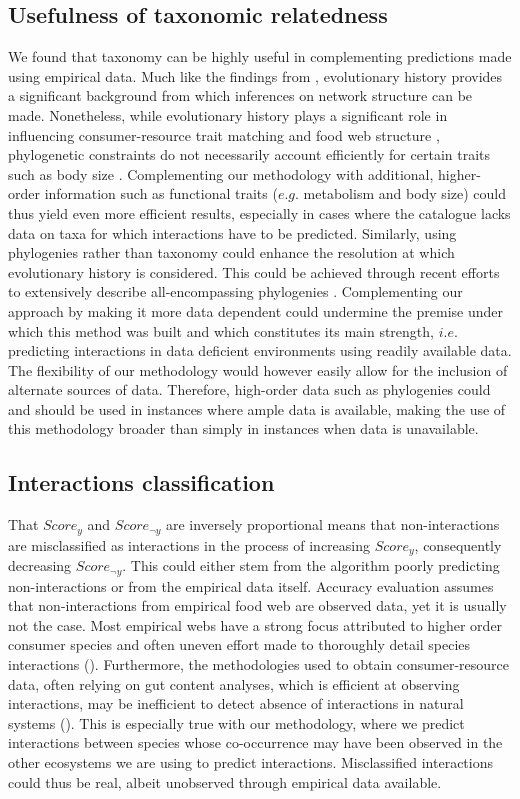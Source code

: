 \subsection{Usefulness of taxonomic relatedness}
We found that taxonomy can be highly useful in complementing predictions made using empirical data. Much like the findings from \citet{eklof2016}, evolutionary history provides a significant background from which inferences on network structure can be made. Nonetheless, while evolutionary history plays a significant role in influencing consumer-resource trait matching and food web structure \citep{mouquet2012, rohr2014}, phylogenetic constraints do not necessarily account efficiently for certain traits such as body size \citep{eklof2016}. Complementing our methodology with additional, higher-order information such as functional traits ($e.g.$ metabolism and body size) could thus yield even more efficient results, especially in cases where the catalogue lacks data on taxa for which interactions have to be predicted. Similarly, using phylogenies rather than taxonomy could enhance the resolution at which evolutionary history is considered. This could be achieved through recent efforts to extensively describe all-encompassing phylogenies \citep[e.g.][]{Hedges2015}. Complementing our approach by making it more data dependent could undermine the premise under which this method was built and which constitutes its main strength, $i.e.$ predicting interactions in data deficient environments using readily available data. The flexibility of our methodology would however easily allow for the inclusion of alternate sources of data. Therefore, high-order data such as phylogenies could and should be used in instances where ample data is available, making the use of this methodology broader than simply in instances when data is unavailable.

\subsection{Interactions classification}
That $Score_{y}$ and $Score_{\neg y}$ are inversely proportional means that non-interactions are misclassified as interactions in the process of increasing $Score_y$, consequently decreasing $Score_{\neg y}$. This could either stem from the algorithm poorly predicting non-interactions or from the empirical data itself. Accuracy evaluation assumes that non-interactions from empirical food web are observed data, yet it is usually not the case. Most empirical webs have a strong focus attributed to higher order consumer species and often uneven effort made to thoroughly detail species interactions (\cite{dunne2006}). Furthermore, the methodologies used to obtain consumer-resource data, often relying on gut content analyses, which is efficient at observing interactions, may be inefficient to detect absence of interactions in natural systems (\cite{dunne2006}). This is especially true with our methodology, where we predict interactions between species whose co-occurrence may have been observed in the other ecosystems we are using to predict interactions. Misclassified interactions could thus be real, albeit unobserved through empirical data available.

